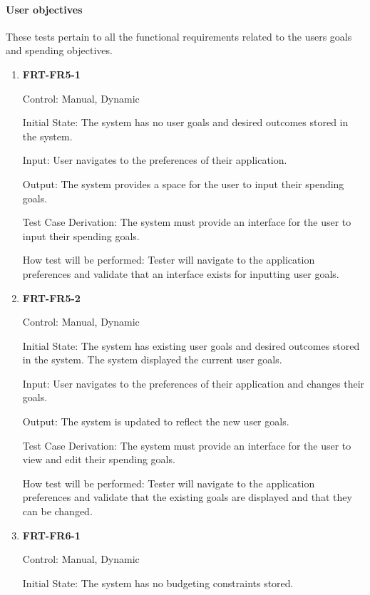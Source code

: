 \documentclass[12pt, titlepage]{article}
\begin{document}
\paragraph{User objectives}

These tests pertain to all the functional requirements related to the users goals and spending objectives.

\begin{enumerate}

\item{\textbf{FRT-FR5-1}}

Control: Manual, Dynamic
          
Initial State: The system has no user goals and desired outcomes stored in the system.

Input: User navigates to the preferences of their application.
          
Output: The system provides a space for the user to input their spending goals.

Test Case Derivation: The system must provide an interface for the user to input their spending goals.
          
How test will be performed: Tester will navigate to the application preferences and validate that an interface exists for inputting user goals.

\item{\textbf{FRT-FR5-2}}

Control: Manual, Dynamic
          
Initial State: The system has existing user goals and desired outcomes stored in the system. The system displayed the current user goals.

Input: User navigates to the preferences of their application and changes their goals.
          
Output: The system is updated to reflect the new user goals.

Test Case Derivation: The system must provide an interface for the user to view and edit their spending goals.
          
How test will be performed: Tester will navigate to the application preferences and validate that the existing goals are displayed and that they can be changed.

\item{\textbf{FRT-FR6-1}}

Control: Manual, Dynamic
          
Initial State: The system has no budgeting constraints stored.


\end{enumerate}
\end{document}
